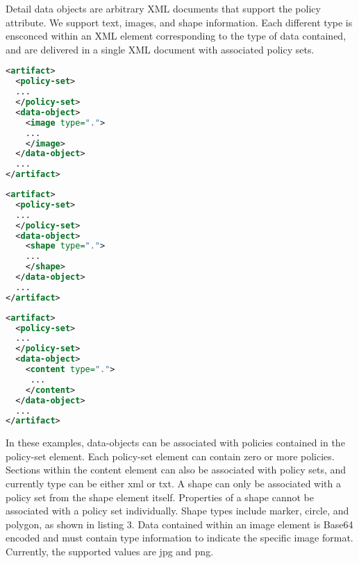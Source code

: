Detail data objects are arbitrary XML documents that support the policy attribute.  We support text, images, and shape information.  Each different type is ensconced within an XML element corresponding to the type of data contained, and are delivered in a single XML document with associated policy sets.


\par\noindent
\begin{minipage}[t]{.30\textwidth}
\begin{lstlisting}[language=xml, label=lst:image-data, caption=Image]
<artifact>
  <policy-set>
  ...
  </policy-set>
  <data-object>
    <image type=".">
    ...
    </image>
  </data-object>
  ...
</artifact>
\end{lstlisting}
\end{minipage}
\hfill
\begin{minipage}[t]{.30\textwidth}
\begin{lstlisting}[language=xml, label=lst:shape-data, caption=Shape]
<artifact>
  <policy-set>
  ...
  </policy-set>
  <data-object>
    <shape type=".">
    ...
    </shape>
  </data-object>
  ...
</artifact>
\end{lstlisting}
\end{minipage}
\hfill
\begin{minipage}[t]{.30\textwidth}
\begin{lstlisting}[language=xml, label=lst:content-data, caption=Content]
<artifact>
  <policy-set>
  ...
  </policy-set>
  <data-object>
    <content type=".">
     ...
    </content>
  </data-object>
  ...
</artifact>
\end{lstlisting}
\end{minipage}

In these examples, data-objects can be associated with policies contained in the policy-set element.  Each policy-set element can contain zero or more policies.  Sections within the content element can also be associated with policy sets, and currently type can be either xml or txt.  A shape can only be associated with a policy set from the shape element itself.  Properties of a shape cannot be associated with a policy set individually.  Shape types include marker, circle, and polygon, as shown in listing 3. Data contained within an image element is Base64 encoded and must contain type information to indicate the specific image format.  Currently, the supported values are jpg and png.

